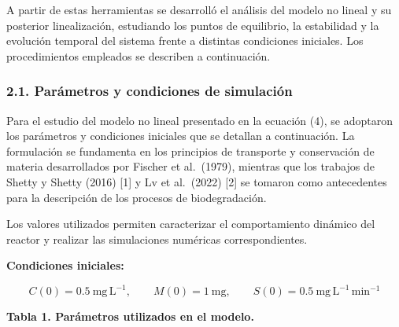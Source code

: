 \documentclass[11pt]{article}
\begin{document}
A partir de estas herramientas se desarrolló el análisis del modelo no
lineal y su posterior linealización, estudiando los puntos de
equilibrio, la estabilidad y la evolución temporal del sistema frente a
distintas condiciones iniciales. Los procedimientos empleados se
describen a continuación.

    \subsubsection{2.1. Parámetros y condiciones de
simulación}\label{paruxe1metros-y-condiciones-de-simulaciuxf3n}

Para el estudio del modelo no lineal presentado en la ecuación (4), se
adoptaron los parámetros y condiciones iniciales que se detallan a
continuación. La formulación se fundamenta en los principios de
transporte y conservación de materia desarrollados por Fischer et
al.~(1979), mientras que los trabajos de Shetty y Shetty (2016) {[}1{]}
y Lv et al.~(2022) {[}2{]} se tomaron como antecedentes para la
descripción de los procesos de biodegradación.

Los valores utilizados permiten caracterizar el comportamiento dinámico
del reactor y realizar las simulaciones numéricas correspondientes.

\textbf{Condiciones iniciales:}

\[
C(0)=0.5\ \mathrm{mg\,L^{-1}}, \qquad
M(0)=1\ \mathrm{mg}, \qquad
S(0)=0.5\ \mathrm{mg\,L^{-1}\,min^{-1}}
\]

\textbf{Tabla 1. Parámetros utilizados en el modelo.}
\end{document}
